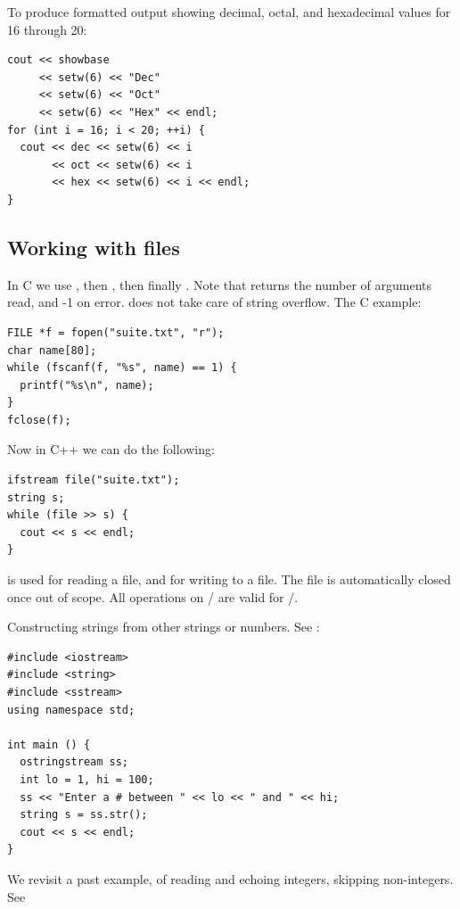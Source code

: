 \documentclass[english, 11pt]{article}
\begin{document}
\begin{exmp}
To produce formatted output showing decimal, octal, and hexadecimal values for 16 through 20:
\begin{lstlisting}
cout << showbase
     << setw(6) << "Dec"
     << setw(6) << "Oct"
     << setw(6) << "Hex" << endl;
for (int i = 16; i < 20; ++i) {
  cout << dec << setw(6) << i
       << oct << setw(6) << i
       << hex << setw(6) << i << endl;
}
\end{lstlisting}
\end{exmp}

\subsection{Working with files}

In C we use , then , then finally . Note that  returns the number of arguments read, and -1 on error.  does not take care of string overflow. The C example:

\begin{lstlisting}
FILE *f = fopen("suite.txt", "r");
char name[80];
while (fscanf(f, "%s", name) == 1) {
  printf("%s\n", name);
}
fclose(f);
\end{lstlisting}

Now in C++ we can do the following:

\begin{lstlisting}
ifstream file("suite.txt");
string s;
while (file >> s) {
  cout << s << endl;
}
\end{lstlisting}

 is used for reading a file, and  for writing to a file. The file is automatically closed once out of scope. All operations on / are valid for /.

\begin{exmp}
  Constructing strings from other strings or numbers. See :
\end{exmp}

\begin{lstlisting}
#include <iostream>
#include <string>
#include <sstream>
using namespace std;

int main () {
  ostringstream ss;
  int lo = 1, hi = 100;
  ss << "Enter a # between " << lo << " and " << hi;
  string s = ss.str();
  cout << s << endl;
}
\end{lstlisting}

We revisit a past example, of reading and echoing integers, skipping non-integers. See 
\end{document}
